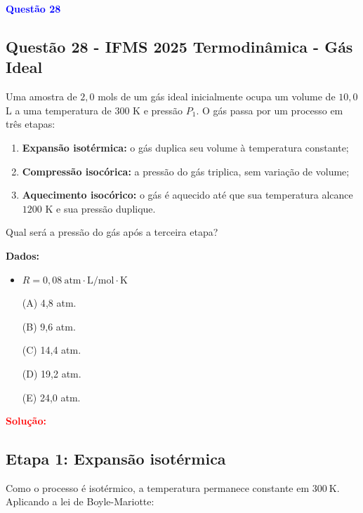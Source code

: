\begin{flushleft}
\textbf{\textcolor{blue}{\Large Quest\~ao 28}}\\
\subsection{Quest\~ao 28 - IFMS 2025 Termodinâmica - G\'as Ideal}
Uma amostra de $2{,}0$ mols de um gás ideal inicialmente ocupa um volume de $10{,}0$ L a uma temperatura de $300$ K e pressão $P_1$. 
O gás passa por um processo em três etapas:

\begin{enumerate}
    \item \textbf{Expansão isotérmica:} o gás duplica seu volume à temperatura constante;
    \item \textbf{Compressão isocórica:} a pressão do gás triplica, sem variação de volume;
    \item \textbf{Aquecimento isocórico:} o gás é aquecido até que sua temperatura alcance $1200$ K e sua pressão duplique.
\end{enumerate}

Qual será a pressão do gás após a terceira etapa?

\bigskip

\textbf{Dados:}

\begin{itemize}
    \item $R = 0{,}08 \ \text{atm} \cdot \text{L} / \text{mol} \cdot \text{K}$
\end{itemize}

\begin{itemize}
\item[(A)] 4{,}8 atm.
\item[(B)] 9{,}6 atm.  
\item[(C)] 14{,}4 atm.
\item[(D)] 19{,}2 atm.
\item[(E)] 24{,}0 atm.
\end{itemize}

\vspace{0.5cm}

\textcolor{red}{\textbf{Solução:}}\\

\subsection*{Etapa 1: Expansão isotérmica}

Como o processo é isotérmico, a temperatura permanece constante em $300 \ \text{K}$. Aplicando a lei de Boyle-Mariotte:


\end{flushleft}
